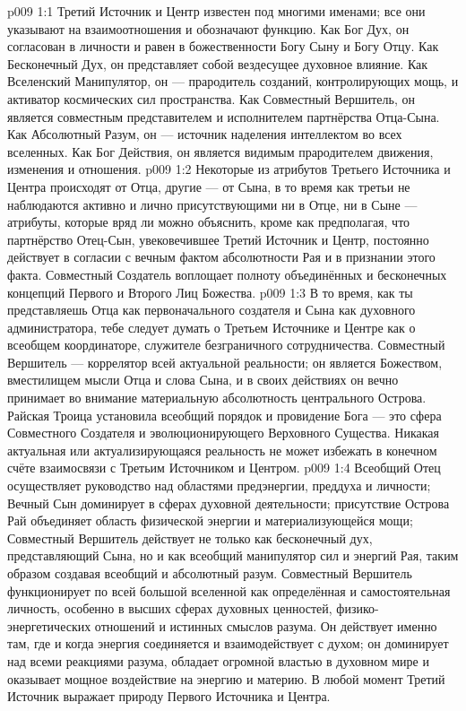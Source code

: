 \vs p009 1:1 Третий Источник и Центр известен под многими именами; все они указывают на взаимоотношения и обозначают функцию. Как Бог Дух, он согласован в личности и равен в божественности Богу Сыну и Богу Отцу. Как Бесконечный Дух, он представляет собой вездесущее духовное влияние. Как Вселенский Манипулятор, он --- прародитель созданий, контролирующих мощь, и активатор космических сил пространства. Как Совместный Вершитель, он является совместным представителем и исполнителем партнёрства Отца\hyp{}Сына. Как Абсолютный Разум, он --- источник наделения интеллектом во всех вселенных. Как Бог Действия, он является видимым прародителем движения, изменения и отношения.
\vs p009 1:2 Некоторые из атрибутов Третьего Источника и Центра происходят от Отца, другие --- от Сына, в то время как третьи не наблюдаются активно и лично присутствующими ни в Отце, ни в Сыне --- атрибуты, которые вряд ли можно объяснить, кроме как предполагая, что партнёрство Отец\hyp{}Сын, увековечившее Третий Источник и Центр, постоянно действует в согласии с вечным фактом абсолютности Рая и в признании этого факта. Совместный Создатель воплощает полноту объединённых и бесконечных концепций Первого и Второго Лиц Божества.
\vs p009 1:3 \pc В то время, как ты представляешь Отца как первоначального создателя и Сына как духовного администратора, тебе следует думать о Третьем Источнике и Центре как о всеобщем координаторе, служителе безграничного сотрудничества. Совместный Вершитель --- коррелятор всей актуальной реальности; он является Божеством, вместилищем мысли Отца и слова Сына, и в своих действиях он вечно принимает во внимание материальную абсолютность центрального Острова. Райская Троица установила всеобщий порядок  и провидение Бога --- это сфера Совместного Создателя и эволюционирующего Верховного Существа. Никакая актуальная или актуализирующаяся реальность не может избежать в конечном счёте взаимосвязи с Третьим Источником и Центром.
\vs p009 1:4 \pc Всеобщий Отец осуществляет руководство над областями предэнергии, преддуха и личности; Вечный Сын доминирует в сферах духовной деятельности; присутствие Острова Рай объединяет область физической энергии и материализующейся мощи; Совместный Вершитель действует не только как бесконечный дух, представляющий Сына, но и как всеобщий манипулятор сил и энергий Рая, таким образом создавая всеобщий и абсолютный разум. Совместный Вершитель функционирует по всей большой вселенной как определённая и самостоятельная личность, особенно в высших сферах духовных ценностей, физико\hyp{}энергетических отношений и истинных смыслов разума. Он действует именно там, где и когда энергия соединяется и взаимодействует с духом; он доминирует над всеми реакциями разума, обладает огромной властью в духовном мире и оказывает мощное воздействие на энергию и материю. В любой момент Третий Источник выражает природу Первого Источника и Центра.
